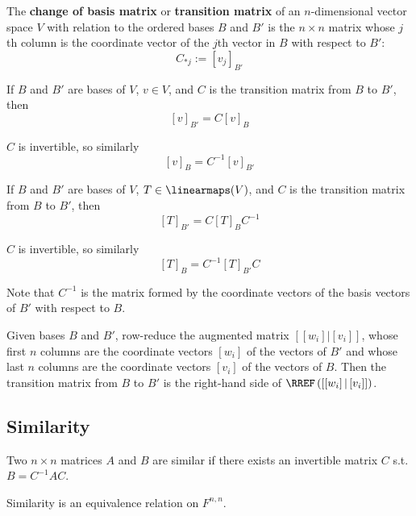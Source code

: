 \begin{definition}
  The \textbf{change of basis matrix} or \textbf{transition matrix} of an $n$-dimensional vector space $V$ with relation to the ordered bases $B$ and $B'$ is the $n \times n$ matrix whose $j$th column is the coordinate vector of the $j$th vector in $B$ with respect to $B'$:
  \[
    C_{*j} := [v_j]_{B'}
  \]
\end{definition}

\begin{lemma}
  If $B$ and $B'$ are bases of $V$, $v \in V$, and $C$ is the transition matrix from $B$ to $B'$, then
  \[
    [v]_{B'} = C [v]_{B}
  \]

  $C$ is invertible, so similarly
  \[
    [v]_{B} = C^{-1} [v]_{B'}
  \]
\end{lemma}

\begin{lemma}
  If $B$ and $B'$ are bases of $V$, $T \in \linearmaps(V)$, and $C$ is the transition matrix from $B$ to $B'$, then
  \[
    [T]_{B'} = C [T]_B C^{-1}
  \]

  $C$ is invertible, so similarly
  \[
    [T]_{B} = C^{-1} [T]_{B'} C
  \]

  Note that $C^{-1}$ is the matrix formed by the coordinate vectors of the basis vectors of $B'$ with respect to $B$.
\end{lemma}

\begin{procedure}
  Given bases $B$ and $B'$, row-reduce the augmented matrix $\left[\left[w_i\right] | \left[v_i\right]\right]$, whose first $n$ columns are the coordinate vectors $\left[w_i\right]$ of the vectors of $B'$ and whose last $n$ columns are the coordinate vectors $\left[v_i\right]$ of the vectors of $B$. Then the transition matrix from $B$ to $B'$ is the right-hand side of $\RREF \left(\left[\left[w_i\right] | \left[v_i\right]\right] \right)$.
\end{procedure}

\subsection{Similarity}

\begin{definition}
  Two $n \times n$ matrices $A$ and $B$ are similar if there exists an invertible matrix $C$ s.t. $B = C^{-1} A C$.

  Similarity is an equivalence relation on $F^{n,n}$.
\end{definition}

